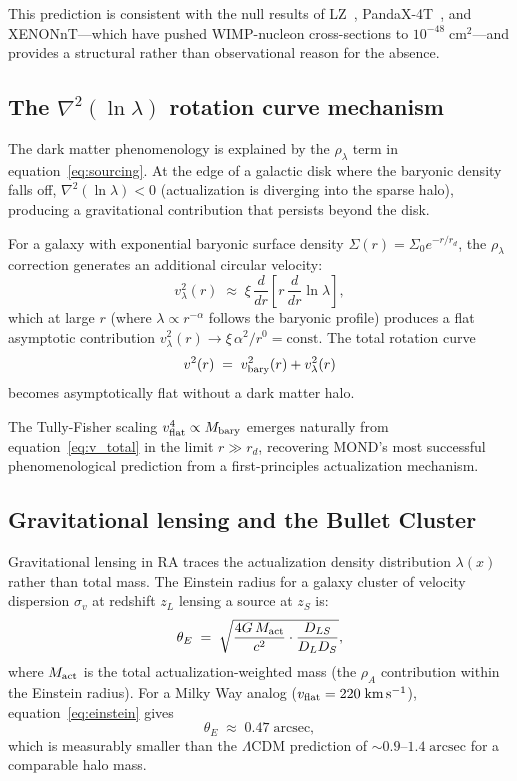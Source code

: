 \documentclass[11pt,twocolumn]{article}
\theoremstyle{plain}
\theoremstyle{remark}
\newcommand{\thetaE}{\theta_E}
\begin{document}
This prediction is consistent with the null results of LZ~\cite{LZ2022},
PandaX-4T~\cite{PandaX2023}, and XENONnT---which have pushed
WIMP-nucleon cross-sections to $10^{-48}\;\mathrm{cm^2}$---and
provides a structural rather than observational reason for the absence.

\subsection{The $\nabla^2(\ln\lambda)$ rotation curve mechanism}

The dark matter phenomenology is explained by the $\rho_\lambda$ term
in equation~\eqref{eq:sourcing}.
At the edge of a galactic disk where the baryonic density falls off,
$\nabla^2(\ln\lambda) < 0$ (actualization is diverging into the
sparse halo), producing a gravitational contribution that persists
beyond the disk.

For a galaxy with exponential baryonic surface density
$\Sigma(r) = \Sigma_0 e^{-r/r_d}$, the $\rho_\lambda$ correction
generates an additional circular velocity:
\begin{equation}
  v_\lambda^2(r)
  \;\approx\; \xi\,\frac{d}{dr}\!\left[r\,\frac{d}{dr}\ln\lambda\right],
  \label{eq:vlambda}
\end{equation}
which at large $r$ (where $\lambda \propto r^{-\alpha}$ follows the
baryonic profile) produces a flat asymptotic contribution
$v_\lambda^2(r) \to \xi\,\alpha^2/r^0 = \mathrm{const}$.
The total rotation curve
\begin{equation}
  v^2(r) \;=\; v_{\rm bary}^2(r) + v_\lambda^2(r)
  \label{eq:v_total}
\end{equation}
becomes asymptotically flat without a dark matter halo.

The Tully-Fisher scaling $v_{\rm flat}^4 \propto M_{\rm bary}$
emerges naturally from equation~\eqref{eq:v_total} in the limit
$r \gg r_d$, recovering MOND's most
successful phenomenological prediction from a first-principles
actualization mechanism.

\subsection{Gravitational lensing and the Bullet Cluster}

Gravitational lensing in RA traces the actualization density
distribution $\lambda(x)$ rather than total mass.
The Einstein radius for a galaxy cluster of velocity dispersion
$\sigma_v$ at redshift $z_L$ lensing a source at $z_S$ is:
\begin{equation}
  \thetaE \;=\; \sqrt{\frac{4G\,M_{\rm act}}{c^2}
               \cdot\frac{D_{LS}}{D_L D_S}},
  \label{eq:einstein}
\end{equation}
where $M_{\rm act}$ is the total actualization-weighted mass (the
$\rho_A$ contribution within the Einstein radius).
For a Milky Way analog ($v_{\rm flat} = 220\;\mathrm{km\,s^{-1}}$),
equation~\eqref{eq:einstein} gives
\begin{equation}
  \thetaE \;\approx\; 0.47\;\mathrm{arcsec},
  \label{eq:theta_mw}
\end{equation}
which is measurably smaller than the $\Lambda$CDM prediction of
$\sim\!0.9$--$1.4\;\mathrm{arcsec}$ for a comparable halo mass.
\end{document}
